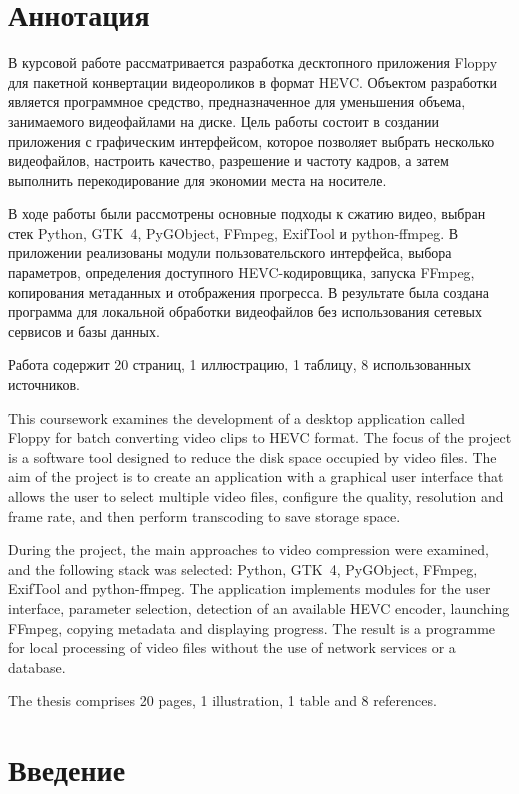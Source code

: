 \documentclass[14pt,a4paper]{extarticle}
\begin{document}
\section*{Аннотация}

В курсовой работе рассматривается разработка десктопного приложения Floppy для пакетной конвертации видеороликов в формат HEVC. Объектом разработки является программное средство, предназначенное для уменьшения объема, занимаемого видеофайлами на диске. Цель работы состоит в создании приложения с графическим интерфейсом, которое позволяет выбрать несколько видеофайлов, настроить качество, разрешение и частоту кадров, а затем выполнить перекодирование для экономии места на носителе.

В ходе работы были рассмотрены основные подходы к сжатию видео, выбран стек Python, GTK~4, PyGObject, FFmpeg, ExifTool и python-ffmpeg. В приложении реализованы модули пользовательского интерфейса, выбора параметров, определения доступного HEVC-кодировщика, запуска FFmpeg, копирования метаданных и отображения прогресса. В результате была создана программа для локальной обработки видеофайлов без использования сетевых сервисов и базы данных.

Работа содержит 20 страниц, 1 иллюстрацию, 1 таблицу, 8 использованных источников.

This coursework examines the development of a desktop application called Floppy for batch converting video clips to HEVC format. The focus of the project is a software tool designed to reduce the disk space occupied by video files. The aim of the project is to create an application with a graphical user interface that allows the user to select multiple video files, configure the quality, resolution and frame rate, and then perform transcoding to save storage space.

During the project, the main approaches to video compression were examined, and the following stack was selected: Python, GTK~4, PyGObject, FFmpeg, ExifTool and python-ffmpeg. The application implements modules for the user interface, parameter selection, detection of an available HEVC encoder, launching FFmpeg, copying metadata and displaying progress. The result is a programme for local processing of video files without the use of network services or a database.

The thesis comprises 20 pages, 1 illustration, 1 table and 8 references.

\newpage
\tableofcontents
\newpage

\section{Введение}
\end{document}
